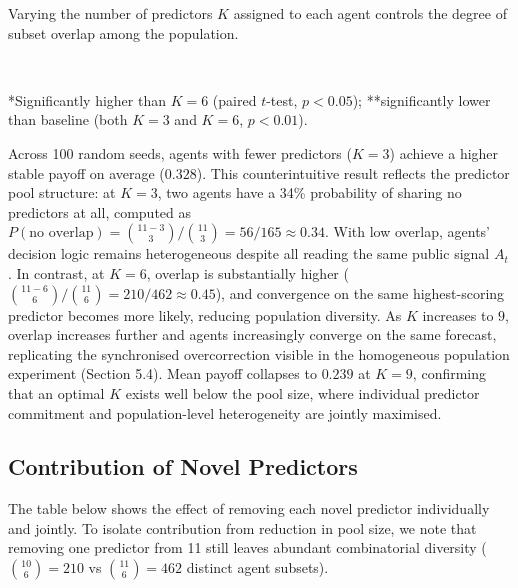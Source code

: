 \documentclass[letterpaper]{article}
\begin{document}
Varying the number of predictors $K$ assigned to each agent controls the degree of subset overlap among the population. \\

\begin{table}[H]
\centering
{} \\
\caption{Predictor Count per Agent}
\end{table}

*Significantly higher than $K=6$ (paired $t$-test, $p<0.05$); **significantly lower than baseline (both $K=3$ and $K=6$, $p<0.01$).

Across 100 random seeds, agents with fewer predictors ($K=3$) achieve a higher stable payoff on average ($0.328$). This counterintuitive result reflects the predictor pool structure: at $K=3$, two agents have a 34\% probability of sharing no predictors at all, computed as $P(\text{no overlap}) = \binom{11-3}{3}/\binom{11}{3} = 56/165 \approx 0.34$. With low overlap, agents' decision logic remains heterogeneous despite all reading the same public signal $A_t$. In contrast, at $K=6$, overlap is substantially higher ($\binom{11-6}{6}/\binom{11}{6} = 210/462 \approx 0.45$), and convergence on the same highest-scoring predictor becomes more likely, reducing population diversity. As $K$ increases to $9$, overlap increases further and agents increasingly converge on the same forecast, replicating the synchronised overcorrection visible in the homogeneous population experiment (Section 5.4). Mean payoff collapses to $0.239$ at $K=9$, confirming that an optimal $K$ exists well below the pool size, where individual predictor commitment and population-level heterogeneity are jointly maximised. \\

\subsection{Contribution of Novel Predictors}

The table below shows the effect of removing each novel predictor individually and jointly. To isolate contribution from reduction in pool size, we note that removing one predictor from 11 still leaves abundant combinatorial diversity ($\binom{10}{6} = 210$ vs $\binom{11}{6} = 462$ distinct agent subsets). \\
\end{document}
